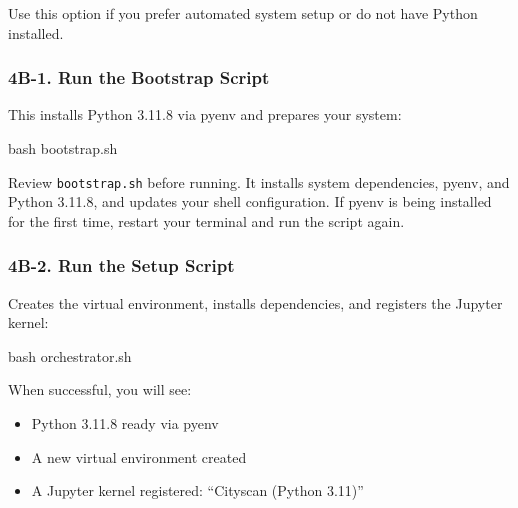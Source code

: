 \documentclass[
  letterpaper,
  DIV=11,
  numbers=noendperiod]{scrreprt}
\newenvironment{Shaded}{\begin{snugshade}}{\end{snugshade}}
\newcommand{\FunctionTok}[1]{\textcolor[rgb]{0.28,0.35,0.67}{#1}}
\newcommand{\NormalTok}[1]{\textcolor[rgb]{0.00,0.23,0.31}{#1}}
\providecommand{\tightlist}{%
  \setlength{\itemsep}{0pt}\setlength{\parskip}{0pt}}
\begin{document}
Use this option if you prefer automated system setup or do not have
Python installed.

\subsubsection{4B-1. Run the Bootstrap
Script}\label{b-1.-run-the-bootstrap-script}

This installs Python 3.11.8 via pyenv and prepares your system:

\begin{Shaded}
\begin{Highlighting}[]
\FunctionTok{bash}\NormalTok{ bootstrap.sh}
\end{Highlighting}
\end{Shaded}

\begin{tcolorbox}[enhanced jigsaw, arc=.35mm, bottomrule=.15mm, bottomtitle=1mm, breakable, colback=white, colbacktitle=quarto-callout-note-color!10!white, colframe=quarto-callout-note-color-frame, coltitle=black, left=2mm, leftrule=.75mm, opacityback=0, opacitybacktitle=0.6, rightrule=.15mm, title=\textcolor{quarto-callout-note-color}{\faInfo}\hspace{0.5em}{Note}, titlerule=0mm, toprule=.15mm, toptitle=1mm]

Review \texttt{bootstrap.sh} before running. It installs system
dependencies, pyenv, and Python 3.11.8, and updates your shell
configuration. If pyenv is being installed for the first time, restart
your terminal and run the script again.

\end{tcolorbox}

\subsubsection{4B-2. Run the Setup
Script}\label{b-2.-run-the-setup-script}

Creates the virtual environment, installs dependencies, and registers
the Jupyter kernel:

\begin{Shaded}
\begin{Highlighting}[]
\FunctionTok{bash}\NormalTok{ orchestrator.sh}
\end{Highlighting}
\end{Shaded}

When successful, you will see:

\begin{itemize}
\tightlist
\item
  Python 3.11.8 ready via pyenv
\item
  A new virtual environment created
\item
  A Jupyter kernel registered: ``Cityscan (Python 3.11)''
\end{itemize}
\end{document}
